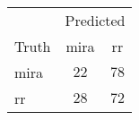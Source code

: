 \begin{tabular}{lcc}
\hline
 & \multicolumn{2}{c}{Predicted} \\ 
Truth  & mira & \multicolumn{1}{c}{rr} \\ 
\hline
mira  & $22$ & $78$ \\
rr  & $28$ & $72$ \\
\hline 
\end{tabular}
